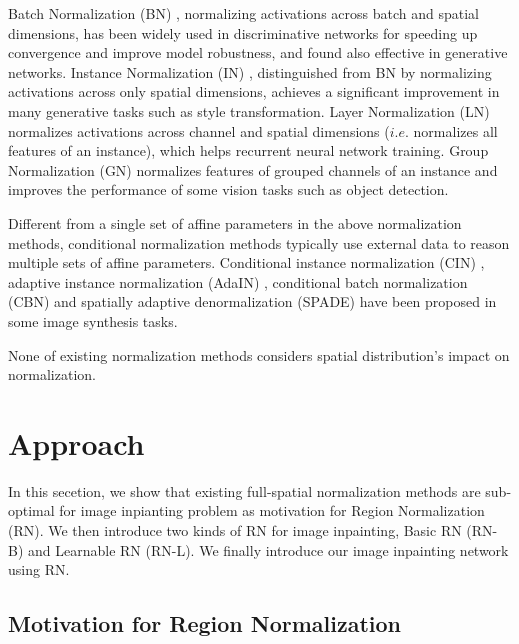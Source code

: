 \documentclass[letterpaper]{article} %
\begin{document}
Batch Normalization (BN) \cite{ioffe2015batch}, normalizing activations across batch and spatial dimensions, has been widely used in discriminative networks for speeding up convergence and improve model robustness, and found also effective in generative networks. Instance Normalization (IN) \cite{ulyanov2016instance}, distinguished from BN by normalizing activations across only spatial dimensions, achieves a significant improvement in many generative tasks such as style transformation. Layer Normalization (LN) \cite{ba2016layer} normalizes activations across channel and spatial dimensions ($i.e.$ normalizes all features of an instance), which helps recurrent neural network training. Group Normalization (GN) \cite{wu2018group} normalizes features of grouped channels of an instance and improves the performance of some vision tasks such as object detection. 

Different from a single set of affine parameters in the above normalization methods, conditional normalization methods typically use external data to reason multiple sets of affine parameters.
Conditional instance normalization (CIN) \cite{dumoulin2016learned}, adaptive instance normalization (AdaIN) \cite{huang2017arbitrary}, conditional batch normalization (CBN) \cite{de2017modulating} and spatially adaptive denormalization (SPADE) \cite{park2019semantic} have been proposed in some image synthesis tasks.

None of existing normalization methods considers spatial distribution's impact on normalization.



\section{Approach}
In this secetion, we show that existing full-spatial normalization methods are sub-optimal for image inpianting problem as motivation for Region Normalization (RN). We then introduce two kinds of RN for image inpainting, Basic RN (RN-B) and Learnable RN (RN-L). We finally introduce our image inpainting network using RN.


\subsection{Motivation for Region Normalization}
\end{document}
